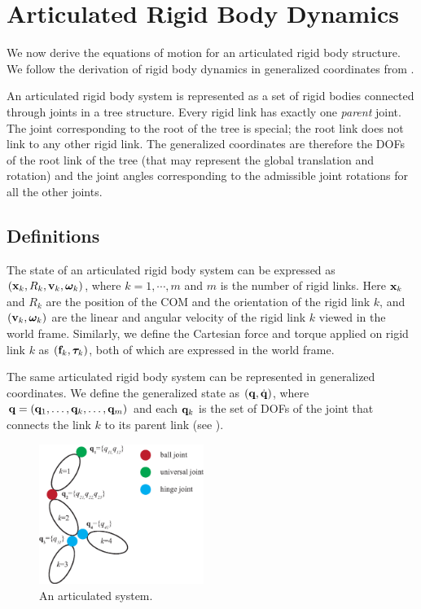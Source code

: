 \section{Articulated Rigid Body Dynamics}
We now derive the equations of motion for an articulated rigid body structure. We follow the derivation of rigid body dynamics in generalized coordinates from .

An articulated rigid body system is represented as a set of rigid bodies connected through joints in a tree structure. Every rigid link has exactly one \emph{parent} joint. The joint corresponding to the root of the tree is special; the root link does not link to any other rigid link. The generalized coordinates are therefore the DOFs of the root link of the tree (that may represent the global translation and rotation) and the joint angles corresponding to the admissible joint rotations for all the other joints. 

\subsection{Definitions}
The state of an articulated rigid body
system can be expressed as $(\mathbf{x}_k, R_k, \mathbf{v}_k,
\boldsymbol{\bm{\omega}}_k)$, where $k = 1, \cdots, m$ and $m$ is the number of rigid links. Here $\mathbf{x}_k$ and
$R_k$ are the position of the COM and the orientation of the rigid link $k$, and $(\mathbf{v}_k,
{\bm{\omega}}_k)$ are the linear and angular velocity of the
rigid link $k$ viewed in the world frame. Similarly, we define the
Cartesian force and torque applied on rigid link $k$ as $(\mathbf{f}_k,
{\bm{\tau}}_k)$, both of which are expressed in the world
frame.

The same articulated rigid body system can be represented in
generalized coordinates. We define the generalized state as $(\mathbf{q},\dot{\mathbf{q}})$, where $\mathbf{q} = (\mathbf{q}_1,\hdots,\mathbf{q}_k,\hdots,\mathbf{q}_m)$ and each $\mathbf{q}_k$ is the set of DOFs of the joint that connects the link $k$ to its parent link (see ). 

\begin{figure}
 \vspace{20pt}
\begin{center}
\includegraphics[width=2.1in]{example1_new.eps}
\end{center}
\caption{An articulated system.}
 \vspace{0pt}
\label{fig:example1}
\end{figure}

